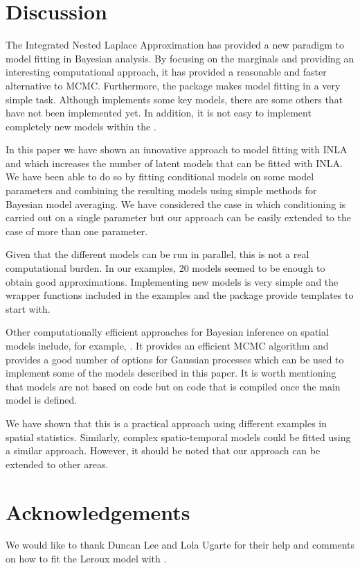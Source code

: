 \documentclass[article]{jss}
\begin{document}
\section{Discussion} \label{sec:disc}

The Integrated Nested Laplace Approximation has provided a new paradigm to
model fitting in Bayesian analysis. By focusing on the marginals and providing
an interesting computational approach, it has provided a reasonable and faster
alternative to MCMC. Furthermore, the  package makes model fitting
in  a very simple task.  Although  implements some key
models, there are some others that have not been implemented yet.
In addition, it is not easy to implement completely new models within the
.

In this paper we have shown an innovative approach to model fitting with INLA
and  which increases the number of latent models that can be fitted
with INLA. We have been able to do so by fitting conditional models on some
model parameters and combining the resulting models using simple methods for
Bayesian model averaging. We have considered the case in which conditioning is
carried out on a single parameter but our approach can be easily extended to the
case of more than one parameter.

Given that the different models can be run in parallel, this is not a real
computational burden. In our examples, 20 models seemed to be enough to obtain
good approximations. Implementing new models is very simple and the wrapper
functions included in the examples and the  package provide
templates to start with.

Other computationally efficient approaches for Bayesian inference on spatial 
models include, for example,  \citep{stan-software:2013}.
It provides an efficient MCMC algorithm and provides a good number of options
for Gaussian processes which can be used to implement some of the models
described in this paper. It is worth mentioning that  models are not
based on  code but on  code that is compiled once the main
model is defined.

We have shown that this is a practical approach using different examples in
spatial statistics. Similarly, complex spatio-temporal models could be fitted
using a similar approach. However, it should be noted that our approach can be
extended to other areas.

\section*{Acknowledgements}

We would like to thank Duncan Lee and Lola Ugarte for their help and comments
on how to fit the Leroux model with .


%

\end{document}

